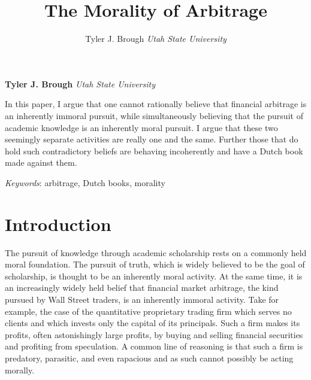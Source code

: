 \documentclass[11pt,]{article}
\title{The Morality of Arbitrage  }
\author{\Large Tyler J. Brough\vspace{0.05in} \newline\normalsize\emph{Utah State University}  }
\date{}
\newcommand*{\authorfont}{\fontfamily{phv}\selectfont}
\renewenvironment{abstract}
 {{%
    \setlength{\leftmargin}{0mm}
    \setlength{\rightmargin}{\leftmargin}%
  }%
  \relax}
 {\endlist}
\begin{document}
	
%

{%
\setlength{\parindent}{0pt}
\thispagestyle{plain}
{\fontsize{18}{20}\selectfont\raggedright 
\maketitle  %

}

{
   \vskip 13.5pt\relax \normalsize\fontsize{11}{12} 
\textbf{\authorfont Tyler J. Brough} \hskip 15pt \emph{\small Utah State University}   

}

}







\begin{abstract}

    \hbox{\vrule height .2pt width 39.14pc}

    \vskip 8.5pt %

\noindent In this paper, I argue that one cannot rationally believe that financial
arbitrage is an inherently immoral pursuit, while simultaneously
believing that the pursuit of academic knowledge is an inherently moral
pursuit. I argue that these two seemingly separate activities are really
one and the same. Further those that do hold such contradictory beliefs
are behaving incoherently and have a Dutch book made against them.


\vskip 8.5pt \noindent \emph{Keywords}: arbitrage, Dutch books, morality \par

    \hbox{\vrule height .2pt width 39.14pc}



\end{abstract}


\vskip 6.5pt

\noindent  \section{Introduction}\label{introduction}

The pursuit of knowledge through academic scholarship rests on a
commonly held moral foundation. The pursuit of truth, which is widely
believed to be the goal of scholarship, is thought to be an inherently
moral activity. At the same time, it is an increasingly widely held
belief that financial market arbitrage, the kind pursued by Wall Street
traders, is an inherently immoral activity. Take for example, the case
of the quantitative proprietary trading firm which serves no clients and
which invests only the capital of its principals. Such a firm makes its
profits, often astonishingly large profits, by buying and selling
financial securities and profiting from speculation. A common line of
reasoning is that such a firm is predatory, parasitic, and even
rapacious and as such cannot possibly be acting morally.
\end{document}
